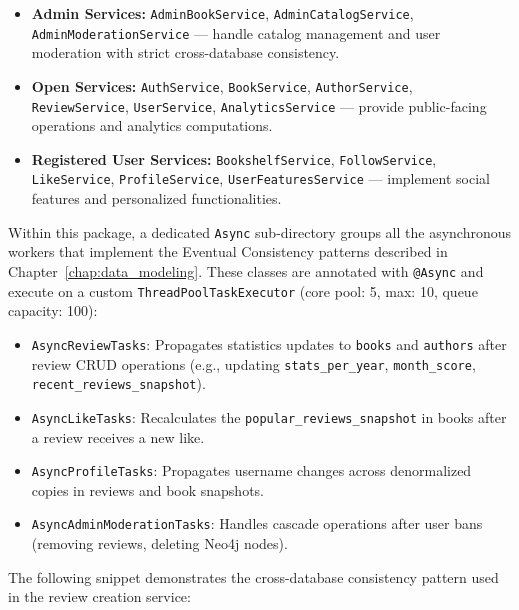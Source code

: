 \begin{itemize}
    \item \textbf{Admin Services:} \texttt{AdminBookService}, \texttt{AdminCatalogService}, \texttt{AdminModerationService} --- handle catalog management and user moderation with strict cross-database consistency.
    \item \textbf{Open Services:} \texttt{AuthService}, \texttt{BookService}, \texttt{AuthorService}, \texttt{ReviewService}, \texttt{UserService}, \texttt{AnalyticsService} --- provide public-facing operations and analytics computations.
    \item \textbf{Registered User Services:} \texttt{BookshelfService}, \texttt{FollowService}, \texttt{LikeService}, \texttt{ProfileService}, \texttt{UserFeaturesService} --- implement social features and personalized functionalities.
\end{itemize}

Within this package, a dedicated \texttt{Async} sub-directory groups all the asynchronous workers that implement the Eventual Consistency patterns described in Chapter~\ref{chap:data_modeling}. These classes are annotated with \texttt{@Async} and execute on a custom \texttt{ThreadPoolTaskExecutor} (core pool: 5, max: 10, queue capacity: 100):

\begin{itemize}
    \item \texttt{AsyncReviewTasks}: Propagates statistics updates to \texttt{books} and \texttt{authors} after review CRUD operations (e.g., updating \texttt{stats\_per\_year}, \texttt{month\_score}, \texttt{recent\_reviews\_snapshot}).
    \item \texttt{AsyncLikeTasks}: Recalculates the \texttt{popular\_reviews\_snapshot} in books after a review receives a new like.
    \item \texttt{AsyncProfileTasks}: Propagates username changes across denormalized copies in reviews and book snapshots.
    \item \texttt{AsyncAdminModerationTasks}: Handles cascade operations after user bans (removing reviews, deleting Neo4j nodes).
\end{itemize}

The following snippet demonstrates the cross-database consistency pattern used in the review creation service:


